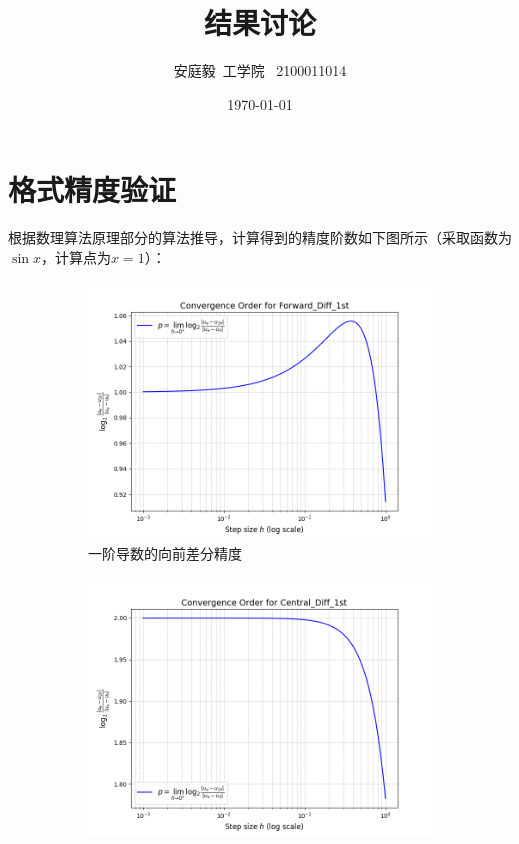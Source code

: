 \documentclass[12pt, a4paper]{article}
\title{结果讨论}
\author{安庭毅\ 工学院 \ 2100011014}
\date{\today} %
\begin{document}
\maketitle %
\section{格式精度验证}
根据数理算法原理部分的算法推导，计算得到的精度阶数如下图所示（采取函数为$\sin x$，计算点为$x=1$）：

\begin{figure}[htbp]
    \centering
    \begin{subfigure}[b]{0.45\textwidth} 
        \centering
        \includegraphics[width=\textwidth]{./pictures/Convergence Order for Forward_Diff_1st.png} 
        \caption{一阶导数的向前差分精度}
        \label{fig: COF1}
    \end{subfigure}
    \hfill
    \begin{subfigure}[b]{0.45\textwidth} 
        \centering
        \includegraphics[width=\textwidth]{./pictures/Convergence Order for Central_Diff_1st.png} 

\end{subfigure}
\end{figure}
\end{document}

